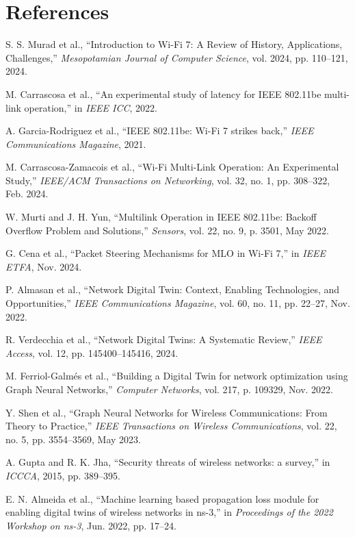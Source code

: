 \documentclass[12pt,a4paper]{article}
\begin{document}
\newpage
\section*{References}

\begin{enumerate}[label={[\arabic*]}]
    \item S. S. Murad et al., ``Introduction to Wi-Fi 7: A Review of History, Applications, Challenges,'' \textit{Mesopotamian Journal of Computer Science}, vol. 2024, pp. 110--121, 2024.
    
    \item M. Carrascosa et al., ``An experimental study of latency for IEEE 802.11be multi-link operation,'' in \textit{IEEE ICC}, 2022.
    
    \item A. Garcia-Rodriguez et al., ``IEEE 802.11be: Wi-Fi 7 strikes back,'' \textit{IEEE Communications Magazine}, 2021.
    
    \item M. Carrascosa-Zamacois et al., ``Wi-Fi Multi-Link Operation: An Experimental Study,'' \textit{IEEE/ACM Transactions on Networking}, vol. 32, no. 1, pp. 308--322, Feb. 2024.
    
    \item W. Murti and J. H. Yun, ``Multilink Operation in IEEE 802.11be: Backoff Overflow Problem and Solutions,'' \textit{Sensors}, vol. 22, no. 9, p. 3501, May 2022.
    
    \item G. Cena et al., ``Packet Steering Mechanisms for MLO in Wi-Fi 7,'' in \textit{IEEE ETFA}, Nov. 2024.
    
    \item P. Almasan et al., ``Network Digital Twin: Context, Enabling Technologies, and Opportunities,'' \textit{IEEE Communications Magazine}, vol. 60, no. 11, pp. 22--27, Nov. 2022.
    
    \item R. Verdecchia et al., ``Network Digital Twins: A Systematic Review,'' \textit{IEEE Access}, vol. 12, pp. 145400--145416, 2024.
    
    \item M. Ferriol-Galmés et al., ``Building a Digital Twin for network optimization using Graph Neural Networks,'' \textit{Computer Networks}, vol. 217, p. 109329, Nov. 2022.
    
    \item Y. Shen et al., ``Graph Neural Networks for Wireless Communications: From Theory to Practice,'' \textit{IEEE Transactions on Wireless Communications}, vol. 22, no. 5, pp. 3554--3569, May 2023.
    
    \item A. Gupta and R. K. Jha, ``Security threats of wireless networks: a survey,'' in \textit{ICCCA}, 2015, pp. 389--395.
    
    \item E. N. Almeida et al., ``Machine learning based propagation loss module for enabling digital twins of wireless networks in ns-3,'' in \textit{Proceedings of the 2022 Workshop on ns-3}, Jun. 2022, pp. 17--24.
\end{enumerate}
\end{document}
